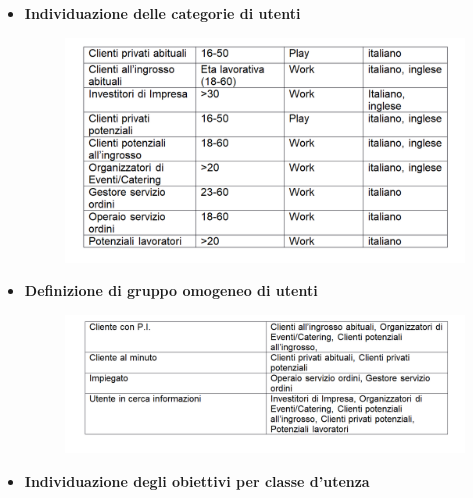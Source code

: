 \begin{itemize}
	\item \textbf{Individuazione delle categorie di utenti}

		\begin{figure}[h!]
			\includegraphics[width=1\linewidth]{StyleLatex/img/catUt.png}
		\end{figure}

	\item \textbf{Definizione di gruppo omogeneo di utenti}

	\begin{figure}[h!]
		\includegraphics[width=1\linewidth]{StyleLatex/img/GrOm.png}
	\end{figure}

	\newpage

	\item \textbf{Individuazione degli obiettivi per classe d'utenza}


\end{itemize}
